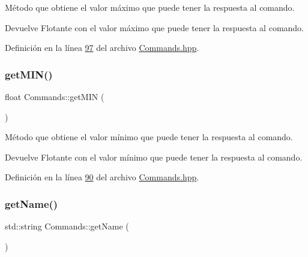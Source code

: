 Método que obtiene el valor máximo que puede tener la respuesta al comando. 

\begin{DoxyReturn}{Devuelve}
Flotante con el valor máximo que puede tener la respuesta al comando. 
\end{DoxyReturn}


Definición en la línea \hyperlink{Commands_8hpp_source_l00097}{97} del archivo \hyperlink{Commands_8hpp_source}{Commands.\+hpp}.

\mbox{\label{classCommands_af0a1e2ea65b5a57997c721a8d77a1013}} 
\subsubsection{\texorpdfstring{get\+M\+I\+N()}{getMIN()}}
{\footnotesize\ttfamily float Commands\+::get\+M\+IN (\begin{DoxyParamCaption}{ }\end{DoxyParamCaption})\hspace{0.3cm}{\ttfamily [inline]}}



Método que obtiene el valor mínimo que puede tener la respuesta al comando. 

\begin{DoxyReturn}{Devuelve}
Flotante con el valor mínimo que puede tener la respuesta al comando. 
\end{DoxyReturn}


Definición en la línea \hyperlink{Commands_8hpp_source_l00090}{90} del archivo \hyperlink{Commands_8hpp_source}{Commands.\+hpp}.

\mbox{\label{classCommands_adf3d8a96310b1f4e57a6ecf0f2f153ea}} 
\subsubsection{\texorpdfstring{get\+Name()}{getName()}}
{\footnotesize\ttfamily std\+::string Commands\+::get\+Name (\begin{DoxyParamCaption}{ }\end{DoxyParamCaption})\hspace{0.3cm}{\ttfamily [inline]}}



